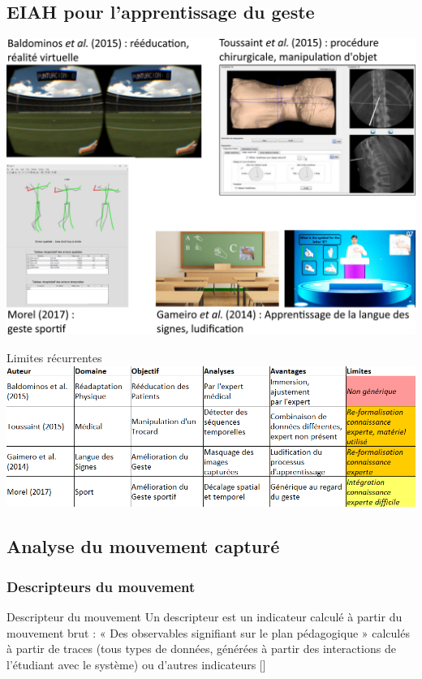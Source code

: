 \documentclass[svgnames]{beamer}
\newcommand{\mycite}[1]{[\textit{\cite{#1}}]}
\begin{document}
	\subsection{EIAH pour l'apprentissage du geste}
		
	\begin{frame}{\secname}
		\centering
		\includegraphics[scale=0.35]{img/all_eiah.png}
	\end{frame}
	
	\begin{frame}{Limites récurrentes}
		\centering
		\includegraphics[scale=0.43]{img/tableau_eiah_5.png}
	\end{frame}
	
	\subsection{Analyse du mouvement capturé}
	\subsubsection{Descripteurs du mouvement}
	\begin{frame}{\subsubsecname}
		\begin{block}{Descripteur du mouvement}
			Un descripteur est un indicateur calculé à partir du mouvement brut :  « Des observables signifiant sur le plan pédagogique » calculés à partir de traces (tous types de données, générées à partir des interactions de l’étudiant avec le système) ou d’autres indicateurs \mycite{Choquet2007MTf}
		\end{block}
	\end{frame}
	
\end{document}
